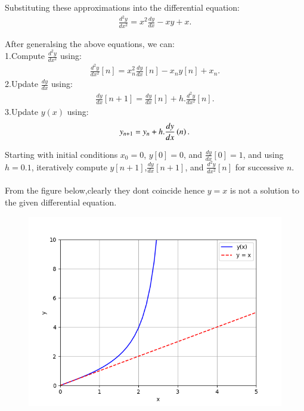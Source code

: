 \documentclass[journal]{IEEEtran}
\begin{document}
Substituting these approximations into the differential equation:
\begin{align}
\frac{d^2y}{dx^2} = x^2 \frac{dy}{dx} - xy + x.
\end{align}

After generalsing the above equations, we can:\\
1.Compute $\frac{d^2y}{dx^2}$ using:
   \begin{align}
   \frac{d^2y}{dx^2}[n] = x_n^2 \frac{dy}{dx}[n] - x_n y[n] + x_n.
   \end{align}
2.Update $\frac{dy}{dx}$ using:
   \begin{align}
   \frac{dy}{dx}[n+1] = \frac{dy}{dx}[n] + h.\frac{d^2y}{dx^2}[n].
   \end{align}
3.Update $y(x)$ using:
   \begin{align}
   y_{n+1} = y_n + h.\frac{dy}{dx}\left(n\right).
   \end{align}

Starting with initial conditions $x_0 = 0$, $y[0] = 0$, and $\frac{dy}{dx}[0] = 1$, and using $h = 0.1$, iteratively compute $y[n+1]$,$\frac{dy}{dx}[n+1]$, and $\frac{d^2y}{dx^2}[n]$ for successive $n$.\\
\\
From the figure below,clearly they dont coincide hence $y=x$ is not a solution to the given differential equation.


\begin{figure}[ht]
	\centering
	\includegraphics[width=1\textwidth]{figs/fig.png}
	\label{fig:Plot1}
\end{figure}
\end{document}
